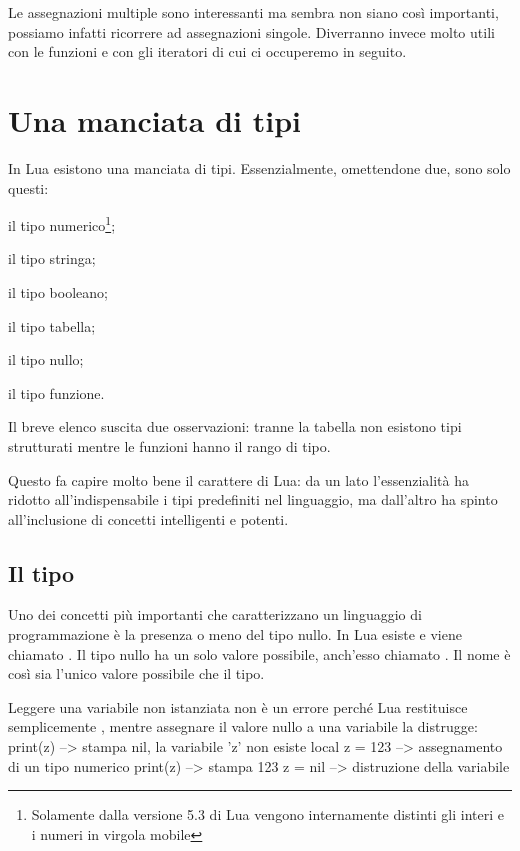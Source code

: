 Le assegnazioni multiple sono interessanti ma sembra non siano così importanti,
possiamo infatti ricorrere ad assegnazioni singole. Diverranno invece molto
utili con le funzioni e con gli iteratori di cui ci occuperemo in seguito.


\section{Una manciata di tipi}

In Lua esistono una manciata di tipi. Essenzialmente, omettendone due, sono solo
questi:
\begin{compactitemize}
\item {} il tipo numerico\footnote{Solamente dalla versione 5.3 di Lua
vengono internamente distinti gli interi e i numeri in virgola mobile};
\item {} il tipo stringa;
\item {} il tipo booleano;
\item {} il tipo tabella;
\item {} il tipo nullo;
\item {} il tipo funzione.
\end{compactitemize}

Il breve elenco suscita due osservazioni: tranne la tabella non esistono
tipi strutturati mentre le funzioni hanno il rango di tipo.

Questo fa capire molto bene il carattere di Lua: da un lato l'essenzialità ha
ridotto all'indispensabile i tipi predefiniti nel linguaggio, ma dall'altro ha
spinto all'inclusione di concetti intelligenti e potenti.


\subsection{Il tipo }

Uno dei concetti più importanti che caratterizzano un linguaggio di
programmazione è la presenza o meno del tipo nullo. In Lua esiste e viene
chiamato . Il tipo nullo ha un solo valore possibile, anch'esso
chiamato . Il nome è così sia l'unico valore possibile che il tipo.

Leggere una variabile non istanziata non è un errore perché Lua restituisce
semplicemente , mentre assegnare il valore nullo a una variabile la
distrugge:
\lines
print(z)      --> stampa nil, la variabile 'z' non esiste
local z = 123 --> assegnamento di un tipo numerico
print(z)      --> stampa 123
z = nil       --> distruzione della variabile
\endlines
{}

